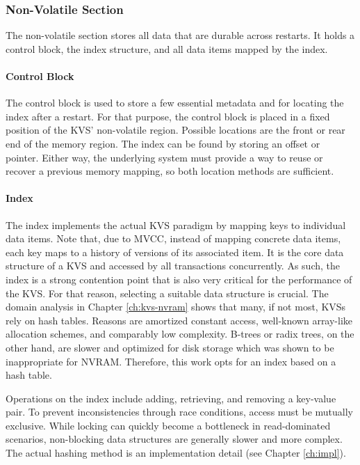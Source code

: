 \subsubsection{Non-Volatile Section}

The non-volatile section stores all data that are durable across restarts. It
holds a control block, the index structure, and all data items mapped by the
index.

\paragraph{Control Block}

The control block is used to store a few essential metadata and for locating the
index after a restart. For that purpose, the control block is placed in a fixed
position of the \ac{KVS}' non-volatile region. Possible locations are the front
or rear end of the memory region. The index can be found by storing an offset or
pointer. Either way, the underlying system must provide a way to reuse or
recover a previous memory mapping, so both location methods are sufficient.

\paragraph{Index}

The index implements the actual \ac{KVS} paradigm by mapping keys to individual
data items. Note that, due to \ac{MVCC}, instead of mapping concrete data items,
each key maps to a history of versions of its associated item. It is the core
data structure of a \ac{KVS} and accessed by all transactions concurrently. As
such, the index is a strong contention point that is also very critical for the
performance of the \ac{KVS}. For that reason, selecting a suitable data
structure is crucial. The domain analysis in Chapter \ref{ch:kvs-nvram} shows
that many, if not most, \acp{KVS} rely on hash tables. Reasons are amortized
constant access, well-known array-like allocation schemes, and comparably low
complexity. B-trees or radix trees, on the other hand, are slower and optimized
for disk storage which was shown to be inappropriate for \ac{NVRAM}. Therefore,
this work opts for an index based on a hash table.

Operations on the index include adding, retrieving, and removing a key-value
pair. To prevent inconsistencies through race conditions, access must be
mutually exclusive. While locking can quickly become a bottleneck in
read-dominated scenarios, non-blocking data structures are generally slower and
more complex. The actual hashing method is an implementation detail (see Chapter \ref{ch:impl}).

